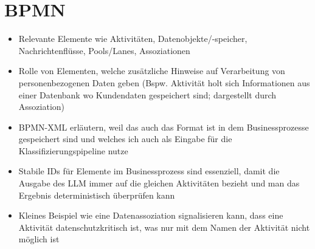 \section{BPMN}\label{sec:bpmn}

\begin{itemize}
    \item Relevante Elemente wie Aktivitäten, Datenobjekte/-speicher, Nachrichtenflüsse, Pools/Lanes, Assoziationen
    \item Rolle von Elementen, welche zusätzliche Hinweise auf Verarbeitung von personenbezogenen Daten geben (Bspw. Aktivität holt sich Informationen aus einer Datenbank wo Kundendaten gespeichert sind; dargestellt durch Assoziation)
    \item BPMN-XML erläutern, weil das auch das Format ist in dem Businessprozesse gespeichert sind und welches ich auch als Eingabe für die Klassifizierungspipeline nutze
    \item Stabile IDs für Elemente im Businessprozess sind essenziell, damit die Ausgabe des LLM immer auf die gleichen Aktivitäten bezieht und man das Ergebnis deterministisch überprüfen kann
    \item Kleines Beispiel wie eine Datenassoziation signalisieren kann, dass eine Aktivität datenschutzkritisch ist, was nur mit dem Namen der Aktivität nicht möglich ist
\end{itemize}